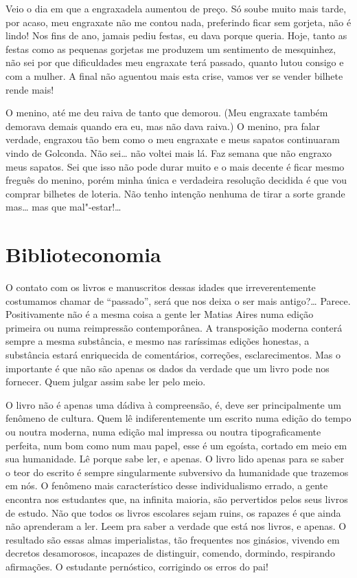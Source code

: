 Veio o dia em que a engraxadela aumentou de preço. Só soube muito mais
tarde, por acaso, meu engraxate não me contou nada, preferindo ficar sem
gorjeta, não é lindo! Nos fins de ano, jamais pediu festas, eu dava
porque queria. Hoje, tanto as festas como as pequenas gorjetas me
produzem um sentimento de mesquinhez, não sei por que dificuldades meu
engraxate terá passado, quanto lutou consigo e com a mulher. A final não
aguentou mais esta crise, vamos ver se vender bilhete rende mais!

O menino, até me deu raiva de tanto que demorou. (Meu engraxate também
demorava demais quando era eu, mas não dava raiva.) O menino, pra falar
verdade, engraxou tão bem como o meu engraxate e meus sapatos
continuaram vindo de Golconda. Não sei\ldots{} não voltei mais lá. Faz semana
que não engraxo meus sapatos. Sei que isso não pode durar muito e o mais
decente é ficar mesmo freguês do menino, porém minha única e verdadeira
resolução decidida é que vou comprar bilhetes de loteria. Não tenho
intenção nenhuma de tirar a sorte grande mas\ldots{} mas que mal"-estar!\ldots{}

\chapter{Biblioteconomia}

O contato com os livros e manuscritos dessas idades que irreverentemente
costumamos chamar de ``passado'', será que nos deixa o ser mais antigo?\ldots{}
Parece. Positivamente não é a mesma coisa a gente ler Matias Aires numa
edição primeira ou numa reimpressão contemporânea. A transposição
moderna conterá sempre a mesma substância, e mesmo nas raríssimas
edições honestas, a substância estará enriquecida de comentários,
correções, esclarecimentos. Mas o importante é que não são apenas os
dados da verdade que um livro pode nos fornecer. Quem julgar assim sabe
ler pelo meio.

O livro não é apenas uma dádiva à compreensão, é, deve ser
principalmente um fenômeno de cultura. Quem lê indiferentemente um
escrito numa edição do tempo ou noutra moderna, numa edição mal impressa
ou noutra tipograficamente perfeita, num bom como num mau papel, esse é
um egoísta, cortado em meio em sua humanidade. Lê porque sabe ler, e
apenas. O livro lido apenas para se saber o teor do escrito é sempre
singularmente subversivo da humanidade que trazemos em nós. O fenômeno
mais característico desse individualismo errado, a gente encontra nos
estudantes que, na infinita maioria, são pervertidos pelos seus livros
de estudo. Não que todos os livros escolares sejam ruins, os rapazes é
que ainda não aprenderam a ler. Leem pra saber a verdade que está nos
livros, e apenas. O resultado são essas almas imperialistas, tão
frequentes nos ginásios, vivendo em decretos desamorosos, incapazes de
distinguir, comendo, dormindo, respirando afirmações. O estudante
pernóstico, corrigindo os erros do pai!


